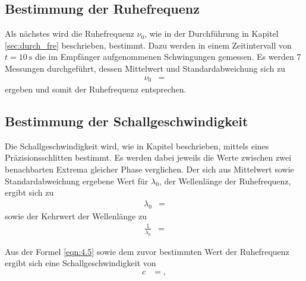 \subsection{Bestimmung der Ruhefrequenz}
Als nächstes wird die Ruhefrequenz $\nu_0$, wie in der Durchführung in Kapitel \ref{sec:durch_fre} beschrieben, bestimmt.
Dazu werden in einem Zeitintervall von $t = \SI{10}{\second}$ die im Empfänger aufgenommenen Schwingungen gemessen.
Es werden 7 Messungen durchgeführt, dessen Mittelwert und Standardabweichung sich zu
\begin{align*}
  \nu_0 &= 
\end{align*}
ergeben und somit der Ruhefrequenz entsprechen.


\subsection{Bestimmung der Schallgeschwindigkeit}
Die Schallgeschwindigkeit wird, wie in Kapitel \label{sec:schall} beschrieben, mittels eines Präzisionsschlitten bestimmt.
Es werden dabei jeweils die Werte zwischen zwei benachbarten Extrema gleicher Phase verglichen.
Der sich aus Mittelwert sowie Standardabweichung ergebene Wert für $\lambda_0$, der Wellenlänge der Ruhefrequenz, ergibt sich zu
\begin{align*}
  \lambda_0 &= 
\end{align*}
sowie der Kehrwert der Wellenlänge zu
\begin{align*}
  \frac{1}{\lambda_0} &= 
\end{align*}

Aus der Formel \ref{eqn:4.5} sowie dem zuvor bestimmten Wert der Ruhefrequenz ergibt sich eine Schallgeschwindigkeit von
\begin{align*}
  c &= ,
\end{align*}

